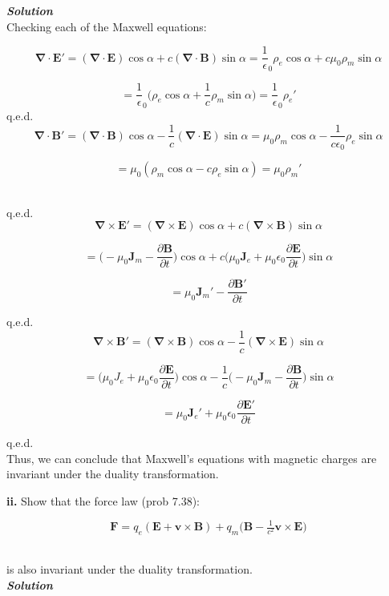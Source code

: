 \documentclass[14pt]{extarticle}
\renewcommand{\v}[1]{{\bm #1}}
\newcommand{\bfit}[1]{\textbf{\textit{#1}}}
\newcommand{\pd}[2]{\frac{\partial #1}{\partial #2}}
\renewcommand{\div}{\boldsymbol \nabla \cdot}
\renewcommand{\curl}{\boldsymbol \nabla \times}
\newcommand{\eo}{\epsilon_0}
\newcommand{\muo}{\mu_0}
\begin{document}
{\bfit{Solution}} \\ 

Checking each of the Maxwell equations:

$$\div \v E' = (\div \v E) \cos\alpha + c(\div \v B)\sin\alpha = \frac 1 \eo \rho_e \cos\alpha + c\muo \rho_m\sin\alpha$$

$$= \frac 1\eo \bigg( \rho_e \cos\alpha + \frac 1c \rho_m\sin\alpha \bigg) = \frac 1\eo \rho_e'$$ 
q.e.d. \\ 

$$\div \v B' = (\div \v B)\cos\alpha - \frac 1c (\div \v E)\sin\alpha = \muo \rho_m\cos\alpha - \frac{1}{c\eo}\rho_e\sin\alpha$$

$$= \muo(\rho_m \cos\alpha - c\rho_e\sin\alpha) = \muo\rho_m'$$ \ 

q.e.d. \\ 

$$\curl \v E' = (\curl \v E)\cos\alpha + c(\curl \v B)\sin\alpha$$

$$= \bigg(-\muo \v J_m - \pd{\v B}{t} \bigg) \cos\alpha + c\bigg( \muo \v J_e + \muo \eo \pd{\v E}{t} \bigg) \sin\alpha$$

$$= \muo \v J_m' - \pd{\v B'}{t}$$ 

q.e.d. \\ 

$$\curl \v B' = (\curl \v B)\cos\alpha - \frac 1c (\curl \v E)\sin\alpha$$

$$= \bigg(\muo J_e + \muo\eo \pd{\v E}{t} \bigg) \cos\alpha - \frac 1c \bigg(-\muo \v J_m -\pd{\v B}{t} \bigg) \sin\alpha$$ 

$$= \muo \v J_e' + \muo\eo \pd{\v E'}{t}$$

q.e.d. \\ 

Thus, we can conclude that Maxwell's equations with magnetic charges are invariant under the duality transformation. \\ 




\dotfill 

\hfill 

{\bf ii.} Show that the force law (prob 7.38):

$$\v F = q_e(\v E + \v v \times \v B) + q_m \big( \v B - \tfrac{1}{c^2}\v v \times \v E \big)$$ \ 

is also invariant under the duality transformation. \\ 

{\bfit{Solution}} \\ 
\end{document}

